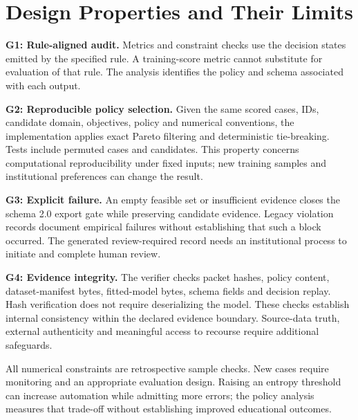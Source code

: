 \section{Design Properties and Their Limits}
\label{sec:design}
\textbf{G1: Rule-aligned audit.} Metrics and constraint checks use the decision states emitted by the specified rule. A training-score metric cannot substitute for evaluation of that rule. The analysis identifies the policy and schema associated with each output.

\textbf{G2: Reproducible policy selection.} Given the same scored cases, IDs, candidate domain, objectives, policy and numerical conventions, the implementation applies exact Pareto filtering and deterministic tie-breaking. Tests include permuted cases and candidates. This property concerns computational reproducibility under fixed inputs; new training samples and institutional preferences can change the result.

\textbf{G3: Explicit failure.} An empty feasible set or insufficient evidence closes the schema 2.0 export gate while preserving candidate evidence. Legacy violation records document empirical failures without establishing that such a block occurred. The generated review-required record needs an institutional process to initiate and complete human review.

\textbf{G4: Evidence integrity.} The verifier checks packet hashes, policy content, dataset-manifest bytes, fitted-model bytes, schema fields and decision replay. Hash verification does not require deserializing the model. These checks establish internal consistency within the declared evidence boundary. Source-data truth, external authenticity and meaningful access to recourse require additional safeguards.

All numerical constraints are retrospective sample checks. New cases require monitoring and an appropriate evaluation design. Raising an entropy threshold can increase automation while admitting more errors; the policy analysis measures that trade-off without establishing improved educational outcomes.
